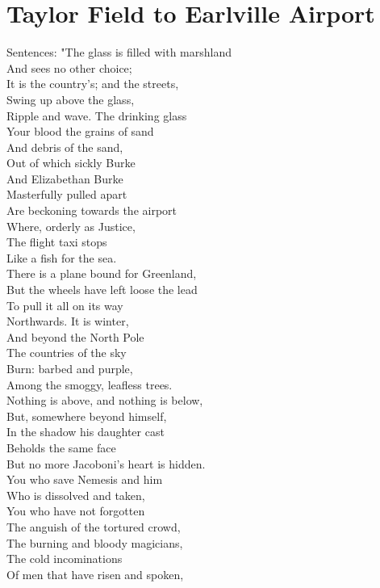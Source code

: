 \documentclass[smalldemyvopaper,11pt,twoside,onecolumn,openright,extrafontsizes]{memoir}
\begin{document}
\chapter{Taylor Field to Earlville Airport}
Sentences: "The glass is filled with marshland
\\And sees no other choice;
\\It is the country's; and the streets,
\\Swing up above the glass,
\\Ripple and wave. The drinking glass
\\Your blood the grains of sand
\\And debris of the sand,
\\Out of which sickly Burke
\\And Elizabethan Burke
\\Masterfully pulled apart
\\Are beckoning towards the airport
\\Where, orderly as Justice,
\\The flight taxi stops
\\Like a fish for the sea.
\\There is a plane bound for Greenland,
\\But the wheels have left loose the lead
\\To pull it all on its way
\\Northwards. It is winter,
\\And beyond the North Pole
\\The countries of the sky
\\Burn: barbed and purple,
\\Among the smoggy, leafless trees.
\\Nothing is above, and nothing is below,
\\But, somewhere beyond himself,
\\In the shadow his daughter cast
\\Beholds the same face
\\But no more Jacoboni's heart is hidden.
\\You who save Nemesis and him
\\Who is dissolved and taken,
\\You who have not forgotten
\\The anguish of the tortured crowd,
\\The burning and bloody magicians,
\\The cold incominations
\\Of men that have risen and spoken,
\end{document}
